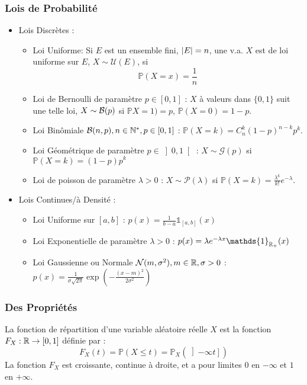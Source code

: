 \documentclass{cours}
\begin{document}
\subsubsection{Lois de Probabilité}
\begin{definition}
    \begin{itemize}
        \item Lois Discrètes :
              \begin{itemize}
                  \item Loi Uniforme: Si $E$ est un ensemble fini, $\left|E\right| = n$, une v.a. $X$ est de loi uniforme sur $E$, $X \sim \mathcal{U}(E)$, si \[\mathbb{P}(X = x) = \frac{1}{n}\]
                  \item Loi de Bernoulli de paramètre $p \in \left[0, 1\right]$ : $X$ à valeurs dans $\{0, 1\}$ suit une telle loi, $X \sim \mathcal{B}(p)$ si $\mathbb{P}X = 1) = p$, $\mathbb{P}(X = 0) = 1- p$.
                  \item Loi Binômiale $\mathcal{B}(n, p), n\in \mathbb{N}^{*}, p\in\left[0, 1\right]$ : $\mathbb{P}(X = k) = C_{n}^{k}\left(1 - p\right)^{n - k}p^{k}$.
                  \item Loi Géométrique de paramètre $p \in \left]0, 1\right[$ : $X \sim \mathcal{G}(p)$ si $\mathbb{P}(X = k) = \left(1 - p\right)p^{k}$
                  \item Loi de poisson de paramètre $\lambda > 0$ : $X \sim \mathcal{P}(\lambda)$ si $\mathbb{P}(X = k) = \frac{\lambda^{k}}{k!}e^{-\lambda}$.
              \end{itemize}
        \item Lois Continues/à Densité :
              \begin{itemize}
                  \item Loi Uniforme sur $\left[a, b\right]$ : $p(x) = \frac{1}{b - a}\mathds{1}_{\left[a, b\right]}(x)$
                  \item Loi Exponentielle de paramètre $\lambda > 0$ : $p(x) = \lambda e^{-\lambda x}\mathds{1}_{\R_{+}}(x)$
                  \item Loi Gaussienne ou Normale $\mathcal{N}(m,\sigma^{2}), m \in \mathbb{R}, \sigma > 0$ : $p(x) = \frac{1}{\sigma\sqrt{2\pi}} \exp\left(- \frac{\left(x - m\right)^{2}}{2 \sigma^{2}}\right)$
              \end{itemize}
    \end{itemize}
\end{definition}

\subsubsection{Des Propriétés}
\begin{definition}
    La fonction de répartition d'une variable aléatoire réelle $X$ est la fonction $F_{X} : \mathbb{R} \rightarrow \left[0, 1\right]$ définie par :
    \[
        F_{X}(t) = \mathbb{P}(X \leq t) = \mathbb{P}_{X}\left(\left]- \infty t\right]\right)
    \]
    La fonction $F_{X}$ est croissante, continue à droite, et a pour limites $0$ en $-\infty$ et $1$ en $+\infty$.
\end{definition}
\end{document}
